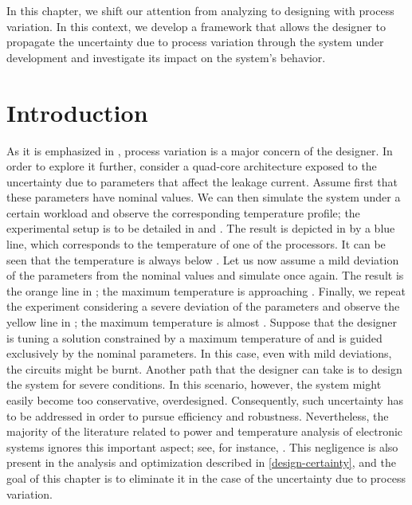 In this chapter, we shift our attention from analyzing to designing with process
variation. In this context, we develop a framework that allows the designer to
propagate the uncertainty due to process variation through the system under
development and investigate its impact on the system's behavior.

\section{Introduction}

As it is emphasized in , process variation is a
major concern of the designer. In order to explore it further, consider a
quad-core architecture exposed to the uncertainty due to parameters that affect
the leakage current. Assume first that these parameters have nominal values. We
can then simulate the system under a certain workload and observe the
corresponding temperature profile; the experimental setup is to be detailed in
 and . The result is depicted in
 by a blue line, which corresponds to the temperature of
one of the processors. It can be seen that the temperature is always below
. Let us now assume a mild deviation of the parameters from the
nominal values and simulate once again. The result is the orange line in
; the maximum temperature is approaching .
Finally, we repeat the experiment considering a severe deviation of the
parameters and observe the yellow line in ; the maximum
temperature is almost . Suppose that the designer is tuning a
solution constrained by a maximum temperature of  and is guided
exclusively by the nominal parameters. In this case, even with mild deviations,
the circuits might be burnt. Another path that the designer can take is to
design the system for severe conditions. In this scenario, however, the system
might easily become too conservative, overdesigned. Consequently, such
uncertainty has to be addressed in order to pursue efficiency and robustness.
Nevertheless, the majority of the literature related to power and temperature
analysis of electronic systems ignores this important aspect; see, for instance,
\cite{rao2009, rai2011, thiele2011}. This negligence is also present in the
analysis and optimization described in \cref{design-certainty}, and the goal of
this chapter is to eliminate it in the case of the uncertainty due to process
variation.

